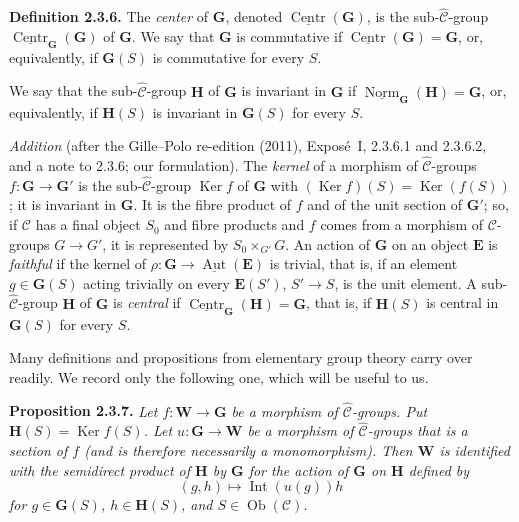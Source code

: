 \medskip
{}
\noindent\textbf{Definition 2.3.6.}
The \emph{center} of \(\mathbf G\), denoted
\(\underline{\operatorname{Centr}}(\mathbf G)\), is the
sub-\(\widehat{\mathscr C}\)-group
\(\underline{\operatorname{Centr}}_{\mathbf G}(\mathbf G)\) of
\(\mathbf G\). We say that \(\mathbf G\) is commutative if
\(\underline{\operatorname{Centr}}(\mathbf G)=\mathbf G\), or,
equivalently, if \(\mathbf G(S)\) is commutative for every \(S\).

We say that the sub-\(\widehat{\mathscr C}\)-group \(\mathbf H\) of
\(\mathbf G\) is invariant in \(\mathbf G\) if
\(\underline{\operatorname{Norm}}_{\mathbf G}(\mathbf H)=\mathbf G\),
or, equivalently, if \(\mathbf H(S)\) is invariant in \(\mathbf G(S)\)
for every \(S\).

\par\medskip\noindent{}%
\emph{Addition} (after the Gille--Polo re-edition (2011), Exposé~I, 2.3.6.1
and 2.3.6.2, and a note to 2.3.6; our formulation). The \emph{kernel} of a
morphism of \(\widehat{\mathscr C}\)-groups \(f:\mathbf G\to\mathbf G'\) is the
sub-\(\widehat{\mathscr C}\)-group \(\operatorname{Ker}f\) of \(\mathbf G\)
with \((\operatorname{Ker}f)(S)=\operatorname{Ker}(f(S))\); it is invariant in
\(\mathbf G\). It is the fibre product of \(f\) and of the unit section of
\(\mathbf G'\); so, if \(\mathscr C\) has a final object \(S_0\) and fibre
products and \(f\) comes from a morphism of \(\mathscr C\)-groups
\(G\to G'\), it is represented by \(S_0\times_{G'}G\). An action of
\(\mathbf G\) on an object \(\mathbf E\) is \emph{faithful} if the kernel of
\(\rho:\mathbf G\to\underline{\operatorname{Aut}}(\mathbf E)\) is trivial,
that is, if an element \(g\in\mathbf G(S)\) acting trivially on every
\(\mathbf E(S')\), \(S'\to S\), is the unit element. A
sub-\(\widehat{\mathscr C}\)-group \(\mathbf H\) of \(\mathbf G\) is
\emph{central} if
\(\underline{\operatorname{Centr}}_{\mathbf G}(\mathbf H)=\mathbf G\), that
is, if \(\mathbf H(S)\) is central in \(\mathbf G(S)\) for every \(S\).
\par\medskip

Many definitions and propositions from elementary group theory carry
over readily. We record only the following one, which will be useful to
us.

\medskip
\noindent{}\textbf{Proposition 2.3.7.}
\textit{Let \(f:\mathbf W\to\mathbf G\) be a morphism of
\(\widehat{\mathscr C}\)-groups. Put
\(\mathbf H(S)=\operatorname{Ker}f(S)\). Let
\(u:\mathbf G\to\mathbf W\) be a morphism of
\(\widehat{\mathscr C}\)-groups that is a section of \(f\) (and is
therefore necessarily a monomorphism). Then \(\mathbf W\) is identified
with the semidirect product of \(\mathbf H\) by \(\mathbf G\) for the
action of \(\mathbf G\) on \(\mathbf H\) defined by
\[
  (g,h)\longmapsto\operatorname{Int}(u(g))h
\]
for \(g\in\mathbf G(S)\), \(h\in\mathbf H(S)\), and
\(S\in\operatorname{Ob}(\mathscr C)\).}

